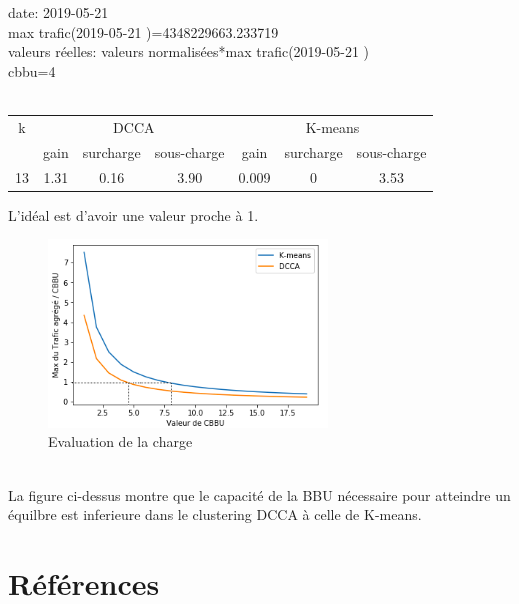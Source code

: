 \documentclass{report}
\begin{document}
\\\\
date: 2019-05-21\\
max trafic(2019-05-21 )=4348229663.233719 \\
valeurs réelles: valeurs normalisées*max trafic(2019-05-21 )\\
cbbu=4\\\\
\begin{tabular}{|c|c|c|c|c|c|c|}
\hline
k & \multicolumn{3}{c|}{DCCA} & \multicolumn{3}{c|}{K-means}\\ 
\cline{2-6} 
        & gain & surcharge & sous-charge  & gain & surcharge & sous-charge  \\   
\hline
13 & 1.31 & 0.16 & 3.90 & 0.009 & 0 & 3.53 \\
\hline
\end{tabular}

 L'idéal est d'avoir une valeur proche à 1.\\
 \begin{figure}[h]
  \centering
  \includegraphics[width=20em]{images/kmeans_vs_dcca.png}
  \caption{Evaluation de la charge}
\end{figure}\\
La figure ci-dessus montre que le capacité de la BBU nécessaire pour atteindre un équilbre est inferieure dans le clustering DCCA 
à celle de K-means. 
\chapter*{Références}
\end{document}
